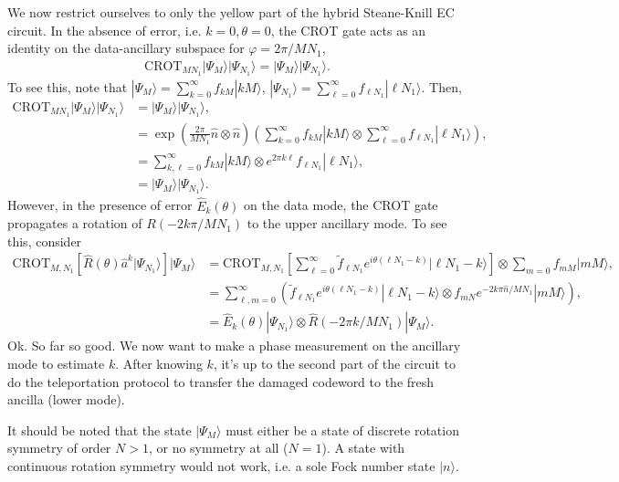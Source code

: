 \documentclass{article}
\begin{document}
We now restrict ourselves to only the yellow part of the hybrid Steane-Knill EC circuit. In the absence of error, i.e. $k=0, \theta=0$, the CROT gate acts as an identity on the data-ancillary subspace for $\varphi=2\pi/MN_1$,
\begin{align}
    \text{CROT}_{MN_1}|\Psi_M\rangle|\Psi_{N_1}\rangle = |\Psi_M\rangle|\Psi_{N_1}\rangle.
\end{align}
To see this, note that $|\Psi_M\rangle =\sum_{k=0}^\infty f_{kM}|kM\rangle$, $|\Psi_{N_1}\rangle=\sum_{\ell=0}^\infty f_{\ell N_1}|\ell N_1\rangle$. Then,
\begin{align}
    \text{CROT}_{MN_1}|\Psi_M\rangle|\Psi_{N_1}\rangle &= |\Psi_M\rangle|\Psi_{N_1}\rangle,\\
    &=\exp\left(\frac{2\pi}{MN_1}\hat{n}\otimes \hat{n}\right)\left(\sum_{k=0}^\infty f_{kM}|kM\rangle\otimes\sum_{\ell=0}^\infty f_{\ell N_1}|\ell N_1\rangle\right),\\
    &=\sum_{k,\ell=0}^{\infty}f_{kM}|kM\rangle \otimes e^{2\pi k\ell}f_{\ell N_1}|\ell N_1\rangle,\\
    &=|\Psi_M\rangle|\Psi_{N_1}\rangle.
\end{align}
However, in the presence of error $\hat{E}_k(\theta)$ on the data mode, the CROT gate propagates a rotation of $R(-2k\pi/MN_1)$ to the upper ancillary mode. To see this, consider
\begin{align}
    \text{CROT}_{M,N_1}\left[\hat{R}(\theta)\hat{a}^k|\Psi_{N_1}\rangle\right]|\Psi_M\rangle &= \text{CROT}_{M,N_1}\left[\sum_{\ell=0}^\infty \tilde{f}_{\ell N_1}e^{i\theta(\ell N_1-k)}|\ell N_1-k\rangle\right]\otimes \sum_{m=0}f_{mM}|mM\rangle,\\
    &=\sum_{\ell, m=0}^\infty\left(\tilde{f}_{\ell N_1}e^{i\theta(\ell N_1-k)}|\ell N_1-k\rangle \otimes f_{mN}e^{{-2k\pi\hat{n}}/{MN_1}}|mM\rangle \right),\\
    &=\hat{E}_k(\theta)|\Psi_{N_1}\rangle \otimes \hat{R}(-2\pi k/MN_1)|\Psi_M\rangle.
\end{align}
Ok. So far so good. We now want to make a phase measurement on the ancillary mode to estimate $k$. After knowing $k$, it's up to the second part of the circuit to do the teleportation protocol to transfer the damaged codeword to the fresh ancilla (lower mode). 

It should be noted that the state $|\Psi_M\rangle$ must either be a state of discrete rotation symmetry of order $N>1$, or no symmetry at all ($N=1$). A state with continuous rotation symmetry would not work, i.e. a sole Fock number state $|n\rangle$. 
\end{document}

